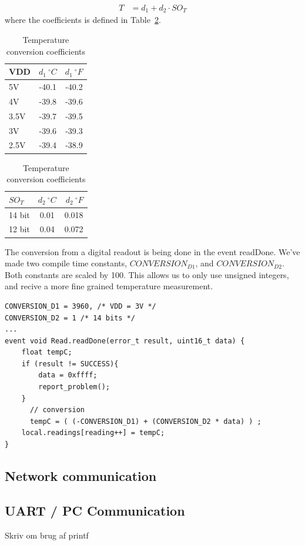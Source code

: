 \begin{align*}
	T &= d_{1} + d_{2} \cdot SO_{T}
\end{align*}
where the coefficients is defined in Table~\ref{table:temperature}.
\begin{table}[ht]
\centering
\begin{tabular}{ | l | c | r | }
	\hline
	VDD & $d_{1} \ ^{\circ}  C$ & $d_{1} \ ^{\circ}  F$ \\
	\hline \hline
	5V & -40.1 & -40.2 \\
	\hline
	4V & -39.8 & -39.6 \\
	\hline
	3.5V & -39.7 & -39.5 \\
	\hline
	3V & -39.6 & -39.3 \\
	\hline
	2.5V & -39.4 & -38.9 \\
	\hline
\end{tabular}
\begin{tabular}{ | l | c | r | }
	\hline
	$SO_{T}$ & $d_{2}  \ ^{\circ}C$ & $d_{2} \ ^{\circ} F$ \\
	\hline \hline
	14 bit & 0.01 & 0.018 \\
	\hline
	12 bit & 0.04 & 0.072\\
	\hline
\end{tabular}
\caption{Temperature conversion coefficients}
\label{table:temperature}
\end{table}
The conversion from a digital readout is being done in the event readDone.
We've made two compile time constants, $CONVERSION_{D1}$, and
$CONVERSION_{D2}$. Both constants are scaled by 100. This allows us to only use
unsigned integers, and recive a more fine grained temperature measurement.

\begin{lstlisting}
CONVERSION_D1 = 3960, /* VDD = 3V */
CONVERSION_D2 = 1 /* 14 bits */
...
event void Read.readDone(error_t result, uint16_t data) {
	float tempC;
	if (result != SUCCESS){
		data = 0xffff;
		report_problem();
	}
	  // conversion
	  tempC = ( (-CONVERSION_D1) + (CONVERSION_D2 * data) ) ;
    local.readings[reading++] = tempC;
}
\end{lstlisting}


\subsection{Network communication}

\subsection{UART / PC Communication}
Skriv om brug af printf

